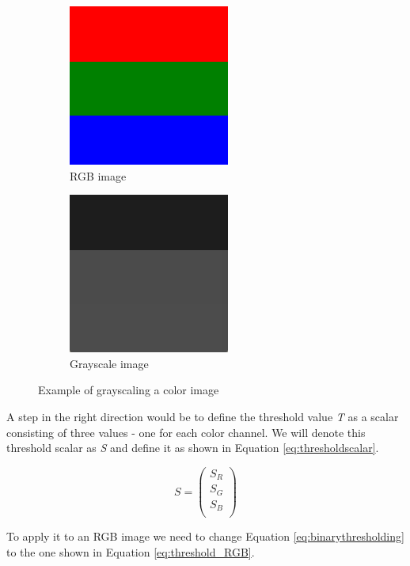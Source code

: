 \begin{figure}
        \centering
        \begin{subfigure}[b]{0.3\textwidth}
                \includegraphics[scale=0.5]{img/RGB}
                \caption{RGB image}
        \end{subfigure}
		\quad
        \begin{subfigure}[b]{0.3\textwidth}
                \includegraphics[scale=0.5]{img/GrayRGB}
                \caption{Grayscale image}
        \end{subfigure}
		\caption{Example of grayscaling a color image}
		\label{fig:RGB2GRAY}
\end{figure}

A step in the right direction would be to define the threshold value \textit{T} as a scalar consisting of three values - one for each color channel. We will denote this threshold scalar as \textit{S} and define it as shown in Equation \ref{eq:thresholdscalar}.

\begin{equation}
S =  
\begin{pmatrix}
  S_{R}\\
  S_{G}\\
  S_{B}\\
\end{pmatrix}
\label{eq:thresholdscalar}
\end{equation}

To apply it to an RGB image we need to change Equation \ref{eq:binarythresholding} to the one shown in Equation \ref{eq:threshold_RGB}.

